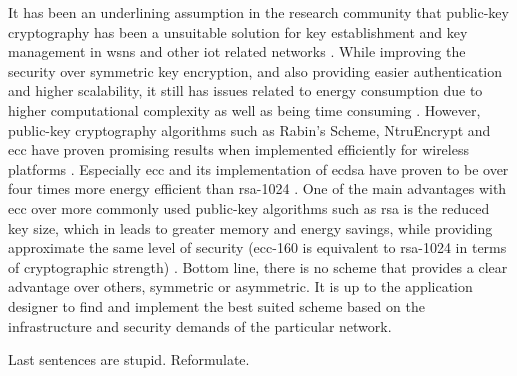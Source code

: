 It has been an underlining assumption in the research community that public-key cryptography has been a unsuitable solution for key establishment and key management in \gls{wsn}s and other \gls{iot} related networks \cite{wander2005energy} \cite{gaubatz2004public}. While improving the security over symmetric key encryption, and also providing easier authentication and higher scalability, it still has issues related to energy consumption due to higher computational complexity as well as being time consuming \citep{Eschenauer2002}. However, public-key cryptography algorithms such as Rabin's Scheme, NtruEncrypt and \gls{ecc} have proven promising results when implemented efficiently for wireless platforms \cite{Jing2014} \cite{gaubatz2004public}. Especially \gls{ecc} and its implementation of \gls{ecdsa} have proven to be over four times more energy efficient than \gls{rsa}-1024 \cite{wander2005energy}. One of the main advantages with \gls{ecc} over more commonly used public-key algorithms such as \gls{rsa} is the reduced key size, which in leads to greater memory and energy savings, while providing approximate the same level of security (\gls{ecc}-160 is equivalent to \gls{rsa}-1024 in terms of cryptographic strength) \cite{nist2016}. Bottom line, there is no scheme that provides a clear advantage over others, symmetric or asymmetric. It is up to the application designer to find and implement the best suited scheme based on the infrastructure and security demands of the particular network.


Last sentences are stupid. Reformulate.





